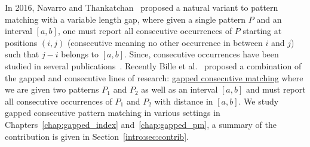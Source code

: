 In 2016, Navarro and Thankatchan~\cite{NAVARRO2016108} proposed a natural variant to pattern matching with a variable length gap, where given a single pattern $P$ and an interval $[a,b]$, one must report all consecutive occurrences of $P$ starting at positions $(i,j)$ (consecutive meaning no other occurrence in between $i$ and $j$) such that $j-i$ belongs to $[a,b]$. Since, consecutive occurrences have been studied in several publications~\cite{DBLP:conf/fsttcs/BilleGPRS20,cpm/BilleGPS21,DBLP:journals/corr/abs-2304-00887,DBLP:journals/corr/abs-2211-16860}.
Recently Bille et al.~\cite{bille2022gapped} proposed a combination of the gapped and consecutive lines of research: \underline{gapped consecutive matching} where we are given two patterns $P_1$ and $P_2$ as well as an interval $[a,b]$ and must report all consecutive occurrences of $P_1$ and $P_2$ with distance in $[a,b]$.
We study gapped consecutive pattern matching in various settings in Chapters~\ref{chap:gapped_index} and~\ref{chap:gapped_pm}, a summary of the contribution is given in Section~\ref{intro:sec:contrib}.

